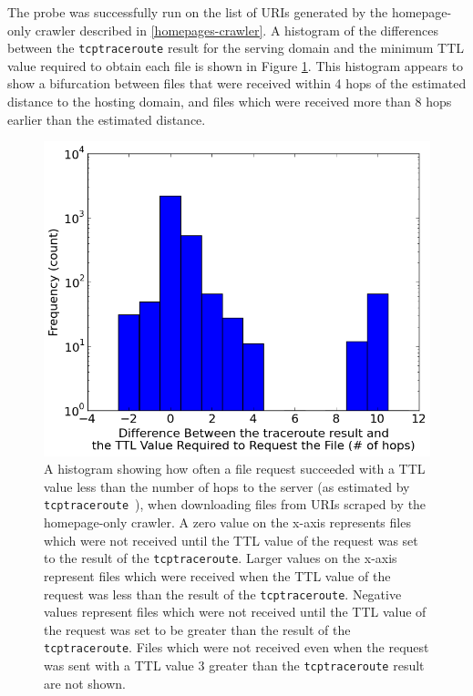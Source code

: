 The probe was successfully run on the list of URIs generated by the homepage-only crawler described in \autoref{homepages-crawler}.
A histogram of the differences between the \texttt{tcptraceroute} result for the serving domain and the minimum TTL value required to obtain each file is shown in Figure \ref{fig_histhomepages}.
This histogram appears to show a bifurcation between files that were received within 4 hops of the estimated distance to the hosting domain, and files which were received more than 8 hops earlier than the estimated distance.
\begin{figure}
	\includegraphics[width=\columnwidth]{figures/histhomepages}
	\caption{
		A histogram showing how often a file request succeeded with a TTL value less than the number of hops to the server (as estimated by \texttt{tcptraceroute}~\cite{Toren2006}), when downloading files from URIs scraped by the homepage-only crawler.
		A zero value on the x-axis represents files which were not received until the TTL value of the request was set to the result of the \texttt{tcptraceroute}.
		Larger values on the x-axis represent files which were received when the TTL value of the request was less than the result of the \texttt{tcptraceroute}.
		Negative values represent files which were not received until the TTL value of the request was set to be greater than the result of the \texttt{tcptraceroute}.
		Files which were not received even when the request was sent with a TTL value 3 greater than the \texttt{tcptraceroute} result are not shown.
	}
	\label{fig_histhomepages}
\end{figure}

